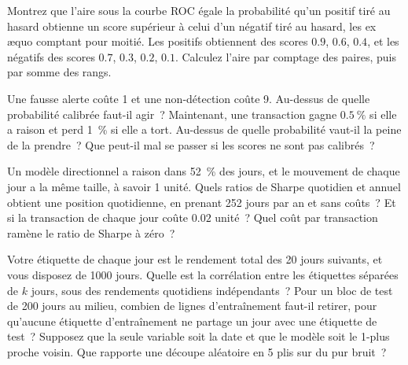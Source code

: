 \begin{question}\label{iq:iv1:machine-learning:25}
Montrez que l'aire sous la courbe ROC égale la probabilité qu'un positif tiré au hasard obtienne un score supérieur à celui d'un négatif tiré au hasard, les ex æquo comptant pour moitié. Les positifs obtiennent des scores $0.9$, $0.6$, $0.4$, et les négatifs des scores $0.7$, $0.3$, $0.2$, $0.1$. Calculez l'aire par comptage des paires, puis par somme des rangs.
\end{question}

\begin{question}\label{iq:iv1:machine-learning:26}
Une fausse alerte coûte 1 et une non-détection coûte 9. Au-dessus de quelle probabilité calibrée faut-il agir~? Maintenant, une transaction gagne $0.5~\%$ si elle a raison et perd 1~\% si elle a tort. Au-dessus de quelle probabilité vaut-il la peine de la prendre~? Que peut-il mal se passer si les scores ne sont pas calibrés~?
\end{question}

\begin{question}\label{iq:iv1:machine-learning:27}
Un modèle directionnel a raison dans 52~\% des jours, et le mouvement de chaque jour a la même taille, à savoir 1 unité. Quels ratios de Sharpe quotidien et annuel obtient une position quotidienne, en prenant 252 jours par an et sans coûts~? Et si la transaction de chaque jour coûte $0.02$ unité~? Quel coût par transaction ramène le ratio de Sharpe à zéro~?
\end{question}

\begin{question}\label{iq:iv1:machine-learning:28}
Votre étiquette de chaque jour est le rendement total des 20 jours suivants, et vous disposez de 1000 jours. Quelle est la corrélation entre les étiquettes séparées de $k$ jours, sous des rendements quotidiens indépendants~? Pour un bloc de test de 200 jours au milieu, combien de lignes d'entraînement faut-il retirer, pour qu'aucune étiquette d'entraînement ne partage un jour avec une étiquette de test~? Supposez que la seule variable soit la date et que le modèle soit le 1-plus proche voisin. Que rapporte une découpe aléatoire en 5 plis sur du pur bruit~?
\end{question}


